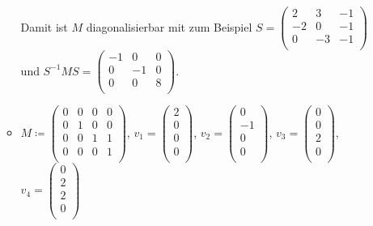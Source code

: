 \documentclass{scrreprt}
\begin{document}
\begin{enumerate}[(a)]
\begin{itemize}
    Damit ist $M$ diagonalisierbar mit zum Beispiel $S = \begin{pmatrix}
      2  & 3  & -1 \\
      -2 & 0  & -1 \\
      0  & -3 & -1 \\
    \end{pmatrix}$ und $S^{-1}MS = \begin{pmatrix}
      -1 & 0  & 0 \\
      0  & -1 & 0 \\
      0  & 0  & 8 \\
    \end{pmatrix}$.

  \item $M \coloneqq \begin{pmatrix}
      0 & 0 & 0 & 0 \\
      0 & 1 & 0 & 0 \\
      0 & 0 & 1 & 1 \\
      0 & 0 & 0 & 1 \\
    \end{pmatrix}$, $v_1 = \begin{pmatrix}
      2 \\
      0 \\
      0 \\
      0 \\
    \end{pmatrix}$, $v_2 = \begin{pmatrix}
      0  \\
      -1 \\
      0  \\
      0  \\
    \end{pmatrix}$, $v_3 = \begin{pmatrix}
      0 \\
      0 \\
      2 \\
      0 \\
    \end{pmatrix}$, $v_4 = \begin{pmatrix}
      0 \\
      2 \\
      2 \\
      0 \\
    \end{pmatrix}$


\end{itemize}
\end{enumerate}
\end{document}

